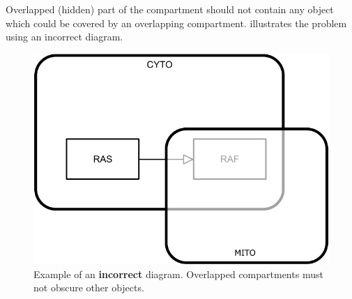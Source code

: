 Overlapped (hidden) part of the compartment should not contain any object which could be covered by an overlapping compartment.   illustrates the problem using an incorrect diagram.

\begin{figure}[H]
  \centering
  \includegraphics[scale = 0.6]{images/build/compartment_overlapping_wrong.pdf}
  \caption{Example of an \textbf{incorrect} diagram.  Overlapped compartments must not obscure other objects.}
  \label{fig:overlap-bad}
\end{figure}

